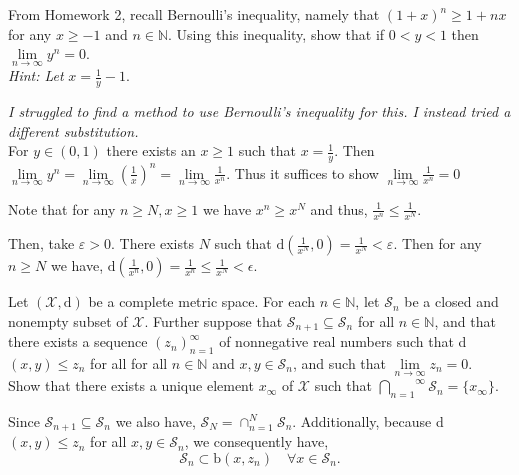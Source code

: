 \documentclass[12pt,letterpaper]{exam}
\begin{document}
\begin{questions}
\begin{solution}
\end{solution}
\clearpage

\question
From Homework 2, recall Bernoulli's inequality, 
namely that \((1+x)^n \geq 1+nx\) for any \(x \geq -1\) and \(n \in\mathbb{N}\).
Using this inequality, show that if \(0 < y < 1\) then 
\(\lim\limits_{n\rightarrow\infty} y^n=0\).\\
\emph{Hint: Let } \(x = \frac{1}{y}-1\).
\begin{solution}
    \emph{I struggled to find a method to use Bernoulli's inequality for this. I instead tried
    a different substitution.} \\[1em]
    For \(y\in(0,1)\) there exists an \(x\geq1\)
    such that \(x=\frac{1}{y}\).
    Then
    \(\lim\limits_{n\rightarrow\infty} y^n 
    = \lim\limits_{n\rightarrow\infty} \left(\frac{1}{x}\right)^n
    = \lim\limits_{n\rightarrow\infty} \frac{1}{x^n}\).
    Thus it suffices to show \(\lim\limits_{n\rightarrow\infty} \frac{1}{x^n}=0\)

    Note that for any \(n\geq N, x\geq 1\)
    we have \(x^n \geq x^N\)
    and thus, \(\frac{1}{x^n} \leq\frac{1}{x^N}\).

    Then, take \(\varepsilon>0\).
    There exists \(N\) such that
    \(\text{d}\left(\frac{1}{x^N},0\right) = \frac{1}{x^N} < \varepsilon\).
    Then for any \(n\geq N\) we have,
    \(\text{d}\left(\frac{1}{x^n},0\right) = \frac{1}{x^n}\leq\frac{1}{x^N} <\epsilon\).

\end{solution}
\clearpage

\question
Let \((\mathcal{X},\text{d})\) be a complete metric space. For each \(n\in\mathbb{N}\),
let \(\mathcal{S}_n\) be a closed and nonempty subset of \(\mathcal{X}\).
Further suppose that \(\mathcal{S}_{n+1} \subseteq \mathcal{S}_n\) for all \(n\in\mathbb{N}\),
and that there exists a sequence \((z_n)_{n=1}^{\infty}\) of nonnegative real
numbers such that d\((x,y)\leq z_n\) for all for all \(n\in\mathbb{N}\) and
\(x,y\in\mathcal{S}_n\), and such that \(\lim\limits_{n\rightarrow\infty} z_n =0\). \\
Show that there exists a unique element \(x_\infty\) of \(\mathcal{X}\) such that
\(\overset{\infty}{\underset{n=1}{\bigcap}}\mathcal{S}_n = \{x_\infty\}\).

\begin{solution}
    Since \(\mathcal{S}_{n+1} \subseteq \mathcal{S}_n\)
    we also have,
    \(\mathcal{S}_N = \cap_{n=1}^N \mathcal{S}_n\).
    Additionally, because
    d\((x,y)\leq z_n\) for all \(x,y\in\mathcal{S}_n\),
    we consequently have,
    \[\mathcal{S}_n \subset \text{b}(x,z_n)\quad \forall x\in \mathcal{S}_n.\]



\end{solution}
\end{questions}
\end{document}
